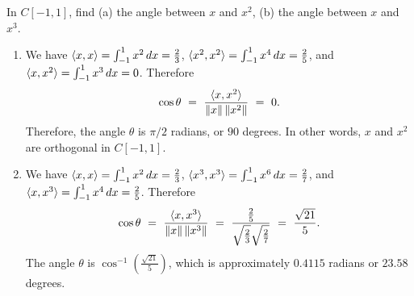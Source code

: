 \begin{ex}
  In $C[-1,1]$, find (a) the angle between $x$ and $x^2$, (b) the
  angle between $x$ and $x^3$.
  \begin{sol}
    \begin{enumerate}
    \item We have $\langle x,x\rangle = \int_{-1}^1 x^2\,dx = \frac{2}{3}$,
      $\langle x^2,x^2\rangle = \int_{-1}^1 x^4\,dx = \frac{2}{5}$, and
      $\langle x, x^2\rangle = \int_{-1}^1 x^3\,dx = 0$.  Therefore
      \begin{equation*}
        \cos\theta
        ~=~ \frac{\langle x,x^2\rangle}{\left\|x\right\|\left\|x^2\right\|}
        ~=~ 0.
      \end{equation*}
      Therefore, the angle $\theta$ is $\pi/2$ radians, or $90$
      degrees. In other words, $x$ and $x^2$ are orthogonal in
      $C[-1,1]$.
    \item We have $\langle x,x\rangle = \int_{-1}^1 x^2\,dx = \frac{2}{3}$,
      $\langle x^3,x^3\rangle = \int_{-1}^1 x^6\,dx = \frac{2}{7}$, and
      $\langle x, x^3\rangle = \int_{-1}^1 x^4\,dx = \frac{2}{5}$.  Therefore
      \begin{equation*}
        \cos\theta
        ~=~ \frac{\langle x,x^3\rangle}{\left\|x\right\|\left\|x^3\right\|}
        ~=~ \frac{\frac{2}{5}}{\sqrt{\frac{2}{3}}\sqrt{\frac{2}{7}}}
        ~=~ \frac{\sqrt{21}}{5}.
      \end{equation*}
      The angle $\theta$ is $\cos^{-1}(\frac{\sqrt{21}}{5})$, which is
      approximately $0.4115$ radians or $23.58$ degrees.
    \end{enumerate}
  \end{sol}    
\end{ex}

